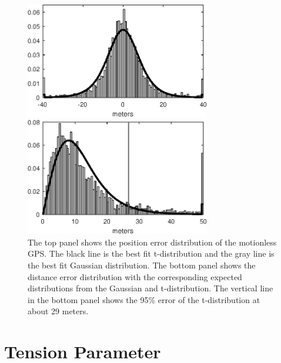 \documentclass[twocol]{ametsoc}
\begin{document}
\begin{figure}
  \centerline{\includegraphics[width=19pc,angle=0]{tfit_error}}
  \centerline{\includegraphics[width=19pc,angle=0]{tfit_distance_error}} 
  \caption{The top panel shows the position error distribution of the motionless GPS. The black line is the best fit t-distribution and the gray line is the best fit Gaussian distribution. The bottom panel shows the distance error distribution with the corresponding expected distributions from the Gaussian and t-distribution. The vertical line in the bottom panel shows the 95\% error of the t-distribution at about 29 meters.}
  \label{tfit_error}
\end{figure}

\section{Tension Parameter}
\end{document}
